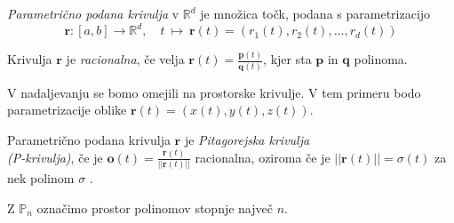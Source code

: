 \documentclass[mat1]{fmfdelo}
\newcommand{\R}{\mathbb R}
\newcommand{\rr}{\boldsymbol r}
\newcommand{\pp}{\boldsymbol p}
\begin{document}
\begin{definicija}
\textit{Parametrično podana krivulja} v $\R^d$ je množica točk, podana s parametrizacijo
\begin{equation*}
\rr: [ a,b ] \rightarrow \R^d, \quad t ~ \longmapsto ~\rr(t) = \left( r_1(t),r_2(t), \dots, r_d(t)\right)
\end{equation*}
\end{definicija}
\begin{definicija}
	Krivulja $\rr$ je \textit{racionalna}, če velja $\rr(t) = \frac{\pp(t)}{\boldsymbol{q}(t)}$, kjer sta $\pp$ in $\boldsymbol{q}$ polinoma.
\end{definicija}
V nadaljevanju se bomo omejili na prostorske krivulje. V tem primeru bodo parametrizacije oblike $\rr(t) = \left( x(t),y(t),z(t) \right)$.
\begin{definicija}
Parametrično podana krivulja $\rr$ je \textit{Pitagorejska krivulja\\ (P-krivulja)}, če je $\boldsymbol{o}(t) = \frac{\rr(t)}{||\rr(t)||}$ racionalna, oziroma če je $||\rr(t)|| = \sigma(t)$ za nek polinom $\sigma$ .
\end{definicija}
\begin{definicija}
	Z $\mathbb{P}_n$ označimo prostor polinomov stopnje največ $n$.
\end{definicija}


\end{document}
